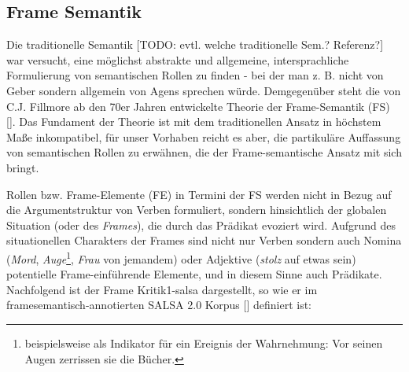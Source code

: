 \documentclass[12pt]{article}
\begin{document}
\subsection{Frame Semantik}

Die traditionelle Semantik [TODO: evtl. welche traditionelle Sem.? Referenz?] war versucht, eine möglichst abstrakte und
allgemeine, intersprachliche Formulierung von semantischen Rollen zu
finden - bei der man z. B. nicht von \glqq{}Geber\grqq{} sondern allgemein
von \glqq{}Agens\grqq{} sprechen würde. Demgegenüber steht die von C.J. Fillmore
ab den 70er Jahren entwickelte Theorie der Frame-Semantik (FS)
[\cite{fillmore1985}]. Das Fundament der Theorie ist mit dem traditionellen
Ansatz in höchstem Maße inkompatibel, für unser Vorhaben reicht es aber, die
partikuläre Auffassung von semantischen Rollen zu erwähnen, die der
Frame-semantische Ansatz mit sich bringt.

Rollen bzw. Frame-Elemente (FE) in Termini der FS werden nicht in Bezug auf die
Argumentstruktur von Verben formuliert, sondern hinsichtlich der globalen
Situation (oder des \textit{Frames}), die durch das Prädikat evoziert wird. Aufgrund
des situationellen Charakters der Frames sind nicht nur Verben sondern auch
Nomina (\textit{Mord}, \textit{Auge}\footnote{beispielsweise als Indikator für ein Ereignis der Wahrnehmung: \glqq{}Vor seinen Augen zerrissen sie die Bücher.\grqq{}}, \textit{Frau} von jemandem) oder Adjektive (\textit{stolz} auf etwas sein) potentielle
Frame-einführende Elemente, und in diesem Sinne auch Prädikate. Nachfolgend ist der Frame \glqq{}Kritik1-salsa\grqq{} dargestellt, so wie er im framesemantisch-annotierten SALSA 2.0 Korpus [\cite{rehbein_adding_2012}] definiert ist:
\end{document}
